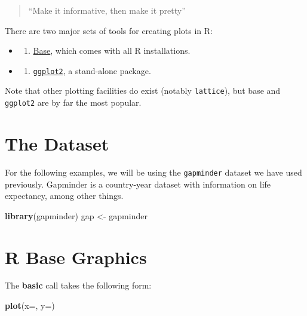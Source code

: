 \documentclass[]{book}
\newenvironment{Shaded}{\begin{snugshade}}{\end{snugshade}}
\newcommand{\KeywordTok}[1]{\textcolor[rgb]{0.13,0.29,0.53}{\textbf{#1}}}
\newcommand{\DataTypeTok}[1]{\textcolor[rgb]{0.13,0.29,0.53}{#1}}
\newcommand{\StringTok}[1]{\textcolor[rgb]{0.31,0.60,0.02}{#1}}
\newcommand{\NormalTok}[1]{#1}
\providecommand{\tightlist}{%
  \setlength{\itemsep}{0pt}\setlength{\parskip}{0pt}}
\begin{document}
\begin{quote}
``Make it informative, then make it pretty''
\end{quote}

There are two major sets of tools for creating plots in R:

\begin{itemize}
\item
  \begin{enumerate}
  \def\labelenumi{\arabic{enumi}.}
  \tightlist
  \item
    \protect\hyperlink{1-r-base-graphics}{Base}, which comes with all R
    installations.
  \end{enumerate}
\item
  \begin{enumerate}
  \def\labelenumi{\arabic{enumi}.}
  \setcounter{enumi}{1}
  \tightlist
  \item
    \protect\hyperlink{2-ggplot2}{\texttt{ggplot2}}, a stand-alone
    package.
  \end{enumerate}
\end{itemize}

Note that other plotting facilities do exist (notably \texttt{lattice}),
but base and \texttt{ggplot2} are by far the most popular.

\section{The Dataset}\label{the-dataset}

For the following examples, we will be using the \texttt{gapminder}
dataset we have used previously. Gapminder is a country-year dataset
with information on life expectancy, among other things.

\begin{Shaded}
\begin{Highlighting}[]
\KeywordTok{library}\NormalTok{(gapminder)}
\NormalTok{gap <-}\StringTok{ }\NormalTok{gapminder}
\end{Highlighting}
\end{Shaded}

\section{R Base Graphics}\label{r-base-graphics}

The \textbf{basic} call takes the following form:

\begin{Shaded}
\begin{Highlighting}[]
\KeywordTok{plot}\NormalTok{(}\DataTypeTok{x=}\NormalTok{, }\DataTypeTok{y=}\NormalTok{)}
\end{Highlighting}
\end{Shaded}
\end{document}
